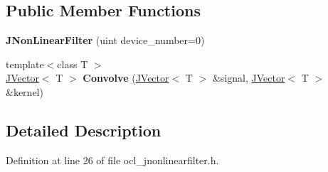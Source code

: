 \subsection*{Public Member Functions}
\begin{DoxyCompactItemize}
\item 
{\bfseries J\+Non\+Linear\+Filter} (uint device\+\_\+number=0)\hypertarget{classjaspl_1_1ocl_1_1_j_non_linear_filter_a3ede26568b4f3fc05001561ebf2ad098}{}\label{classjaspl_1_1ocl_1_1_j_non_linear_filter_a3ede26568b4f3fc05001561ebf2ad098}

\item 
{\footnotesize template$<$class T $>$ }\\\hyperlink{classjaspl_1_1_j_vector}{J\+Vector}$<$ T $>$ {\bfseries Convolve} (\hyperlink{classjaspl_1_1_j_vector}{J\+Vector}$<$ T $>$ \&signal, \hyperlink{classjaspl_1_1_j_vector}{J\+Vector}$<$ T $>$ \&kernel)\hypertarget{classjaspl_1_1ocl_1_1_j_non_linear_filter_a93e27f146f7c58454c2e801cd1337bb5}{}\label{classjaspl_1_1ocl_1_1_j_non_linear_filter_a93e27f146f7c58454c2e801cd1337bb5}

\end{DoxyCompactItemize}


\subsection{Detailed Description}


Definition at line 26 of file ocl\+\_\+jnonlinearfilter.\+h.

